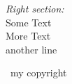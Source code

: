 \begin{titlepage}
\begin{onehalfspace}
\begin{minipage}[t]{0.43\textwidth}
		\begin{flushright} 
			\emph{\large Right section:} \\[0.3em]
			Some Text \\
			More Text \\
			another line \\
		\end{flushright}
	\end{minipage}\vfill
\end{onehalfspace}
	\textcopyright \the\year\ my copyright	

\end{titlepage}